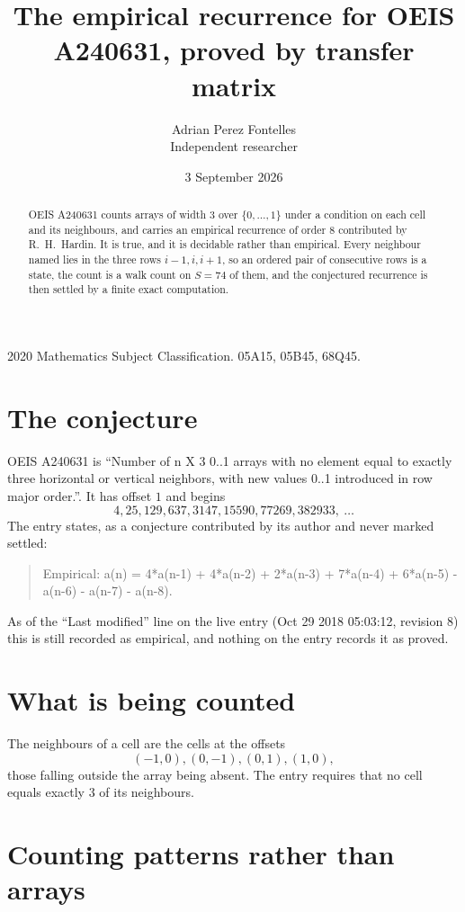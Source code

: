 \documentclass[11pt,a4paper]{article}
\title{The empirical recurrence for OEIS A240631, proved by transfer matrix}
\author{Adrian Perez Fontelles\\ \small Independent researcher}
\date{3 September 2026}
\theoremstyle{plain}
\theoremstyle{definition}
\begin{document}
\maketitle

\begin{abstract}
OEIS A240631 counts arrays of width $3$ over $\{0,\dots,1\}$ under a condition on each cell
and its neighbours, and carries an empirical recurrence of order $8$ contributed by
R.~H.~Hardin. It is true, and it is decidable rather than empirical. Every neighbour named lies
in the three rows $i-1,i,i+1$, so an ordered pair of consecutive rows is a state, the count is
a walk count on $S=74$ of them, and the conjectured recurrence is then settled by a finite
exact computation.
\end{abstract}

\noindent\small 2020 Mathematics Subject Classification. 05A15, 05B45, 68Q45.\normalsize

\section{The conjecture}

OEIS A240631 is ``Number of n X 3 0..1 arrays with no element equal to exactly three horizontal or vertical neighbors, with new values 0..1 introduced in row major order.''. It has offset $1$ and begins
\[
4, 25, 129, 637, 3147, 15590, 77269, 382933,\ \dots
\]
The entry states, as a conjecture contributed by its author and never marked settled:
\begin{quote}
Empirical: a(n) = 4*a(n-1) + 4*a(n-2) + 2*a(n-3) + 7*a(n-4) + 6*a(n-5) - a(n-6) - a(n-7) - a(n-8).
\end{quote}
As of the ``Last modified'' line on the live entry (Oct 29 2018 05:03:12, revision 8) this is still
recorded as empirical, and nothing on the entry records it as proved.

\section{What is being counted}

The neighbours of a cell are the cells at the offsets
\[
(-1,0), (0,-1), (0,1), (1,0),
\]
those falling outside the array being absent. The entry requires that no cell equals exactly $3$ of its neighbours.

\section{Counting patterns rather than arrays}
\end{document}
